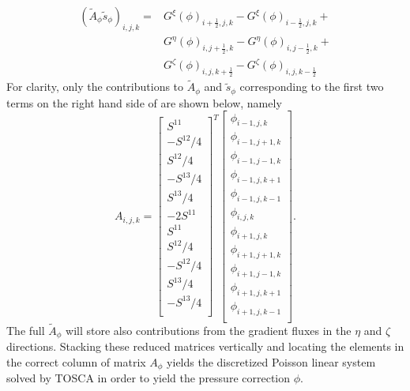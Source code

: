 \begin{align}
	\left(\widetilde{A}_\phi\widetilde{s}_\phi\right)_{i,j,k} =
	&G^\xi(\phi)_{i+\frac{1}{2},j,k} - G^\xi(\phi)_{i-\frac{1}{2},j,k} + \nonumber \\
	&G^\eta(\phi)_{i,j+\frac{1}{2},k} - G^\eta(\phi)_{i,j-\frac{1}{2},k} +  \nonumber \\
	&G^\zeta(\phi)_{i,j,k+\frac{1}{2}} - G^\zeta(\phi)_{i,j,k-\frac{1}{2}} 
	\label{eq:poissonAtilde}
\end{align}
For clarity, only the contributions to $\widetilde{A}_\phi$ and $\widetilde{s}_\phi$ corresponding to the first two terms on the right hand side of  are shown below, namely
\begin{equation}
	A_{i,j,k} = 
	\begin{bmatrix}
		S^{11} \\
		-S^{12}/4 \\
		 S^{12}/4 \\
		-S^{13}/4 \\
		 S^{13}/4 \\
		 -2S^{11} \\
		 S^{11} \\
		  S^{12}/4 \\
		 -S^{12}/4 \\
		  S^{13}/4 \\
		 -S^{13}/4 \\
	\end{bmatrix}^T
    \begin{bmatrix}
    	\phi_{i-1,j,k} \\
    	\phi_{i-1,j+1,k} \\
    	\phi_{i-1,j-1,k} \\
    	\phi_{i-1,j,k+1} \\
    	\phi_{i-1,j,k-1} \\
    	\phi_{i,j,k} \\
    	\phi_{i+1,j,k} \\
    	\phi_{i+1,j+1,k} \\
    	\phi_{i+1,j-1,k} \\
    	\phi_{i+1,j,k+1} \\
    	\phi_{i+1,j,k-1} \\
    \end{bmatrix}.
    \label{eq:Aijk}
\end{equation}
The full $\widetilde{A}_\phi$ will store also contributions from the gradient fluxes in the $\eta$ and $\zeta$ directions. Stacking these reduced matrices vertically and locating the elements in the correct column of matrix $A_\phi$ yields the discretized Poisson linear system solved by TOSCA in order to yield the pressure correction $\phi$. 

